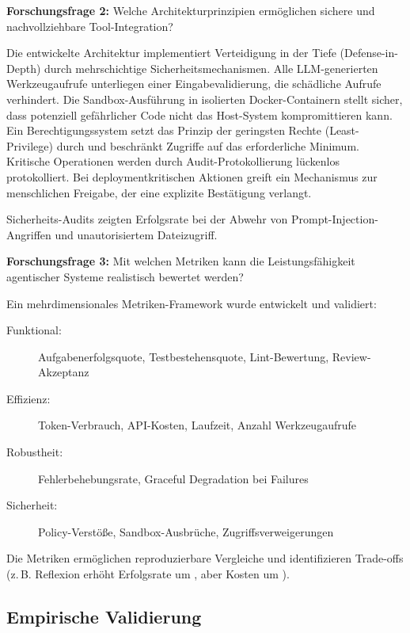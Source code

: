 \textbf{Forschungsfrage 2:} Welche Architekturprinzipien ermöglichen sichere und nachvollziehbare Tool-Integration?

Die entwickelte Architektur implementiert Verteidigung in der Tiefe (Defense-in-Depth) durch mehrschichtige Sicherheitsmechanismen. Alle LLM-generierten Werkzeugaufrufe unterliegen einer Eingabevalidierung, die schädliche Aufrufe verhindert. Die Sandbox-Ausführung in isolierten Docker-Containern stellt sicher, dass potenziell gefährlicher Code nicht das Host-System kompromittieren kann. Ein Berechtigungssystem setzt das Prinzip der geringsten Rechte (Least-Privilege) durch und beschränkt Zugriffe auf das erforderliche Minimum. Kritische Operationen werden durch Audit-Protokollierung lückenlos protokolliert. Bei deploymentkritischen Aktionen greift ein Mechanismus zur menschlichen Freigabe, der eine explizite Bestätigung verlangt.

Sicherheits-Audits zeigten  Erfolgsrate bei der Abwehr von Prompt-Injection-Angriffen und unautorisiertem Dateizugriff.

\textbf{Forschungsfrage 3:} Mit welchen Metriken kann die Leistungsfähigkeit agentischer Systeme realistisch bewertet werden?

Ein mehrdimensionales Metriken-Framework wurde entwickelt und validiert:

\begin{description}
  \item[Funktional:] Aufgabenerfolgsquote, Testbestehensquote, Lint-Bewertung, Review-Akzeptanz
  \item[Effizienz:] Token-Verbrauch, API-Kosten, Laufzeit, Anzahl Werkzeugaufrufe
  \item[Robustheit:] Fehlerbehebungsrate, Graceful Degradation bei Failures
  \item[Sicherheit:] Policy-Verstöße, Sandbox-Ausbrüche, Zugriffsverweigerungen
\end{description}

Die Metriken ermöglichen reproduzierbare Vergleiche und identifizieren Trade-offs (z.\,B. Reflexion erhöht Erfolgsrate um , aber Kosten um ).

\subsection{Empirische Validierung}

